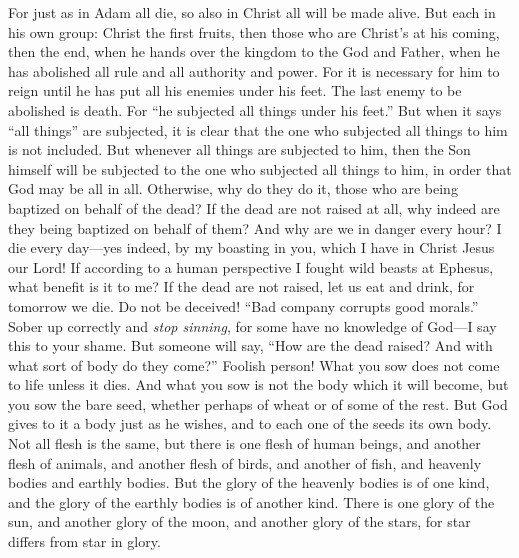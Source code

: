\begin{biblechapter}
\verse For just as in Adam all die, so also in Christ all will be made alive.
\verse But each in his own group: Christ the first fruits, then those who are Christ’s at his coming,
\verse then the end, when he hands over the kingdom to the God and Father, when he has abolished all rule and all authority and power.
\verse For it is necessary for him to reign until he has put all his enemies under his feet.
\verse The last enemy to be abolished is death.
\verse For “he subjected all things under his feet.” But when it says “all things” are subjected, it is clear that the one who subjected all things to him is not included.
\verse But whenever all things are subjected to him, then the Son himself will be subjected to the one who subjected all things to him, in order that God may be all in all.
\verse Otherwise, why do they do it, those who are being baptized on behalf of the dead? If the dead are not raised at all, why indeed are they being baptized on behalf of them?
\verse And why are we in danger every hour?
\verse I die every day—yes indeed, by my boasting in you, which I have in Christ Jesus our Lord!
\verse If according to a human perspective I fought wild beasts at Ephesus, what benefit is it to me? If the dead are not raised, let us eat and drink, for tomorrow we die.
\verse Do not be deceived! “Bad company corrupts good morals.”
\verse Sober up correctly and \textit{stop sinning}, for some have no knowledge of God—I say this to your shame.
 But someone will say, “How are the dead raised? And with what sort of body do they come?”
\verse Foolish person! What you sow does not come to life unless it dies.
\verse And what you sow is not the body which it will become, but you sow the bare seed, whether perhaps of wheat or of some of the rest.
\verse But God gives to it a body just as he wishes, and to each one of the seeds its own body.
\verse Not all flesh is the same, but there is one flesh of human beings, and another flesh of animals, and another flesh of birds, and another of fish,
\verse and heavenly bodies and earthly bodies. But the glory of the heavenly bodies is of one kind, and the glory of the earthly bodies is of another kind.
\verse There is one glory of the sun, and another glory of the moon, and another glory of the stars, for star differs from star in glory.

\end{biblechapter}
